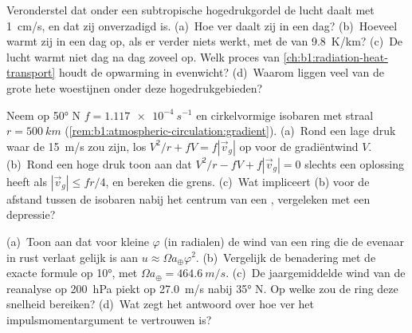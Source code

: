 \begin{exercise}[$\star\star$]\label{exo:b1:atmospheric-circulation:9}
Veronderstel dat onder een subtropische hogedrukgordel de lucht daalt met \qty{1}{cm/s}, en dat zij onverzadigd is. (a)~Hoe ver daalt zij in een dag? (b)~Hoeveel warmt zij in een dag op, als er verder niets werkt, met de  van \qty{9.8}{K/km}? (c)~De lucht warmt niet dag na dag zoveel op. Welk proces van \cref{ch:b1:radiation-heat-transport} houdt de opwarming in evenwicht? (d)~Waarom liggen veel van de grote hete woestijnen onder deze hogedrukgebieden?
\end{exercise}

\begin{exercise}[$\star\star\star$]\label{exo:b1:atmospheric-circulation:10}
Neem op \ang{50} N $f = \qty{1.117e-4}{s^{-1}}$ en cirkelvormige isobaren met straal
$r = \qty{500}{km}$ (\cref{rem:b1:atmospheric-circulation:gradient}). (a)~Rond
een lage druk waar de  \qty{15}{m/s} zou zijn, los $V^2/r + fV =
f|\vec v_g|$ op voor de gradiëntwind $V$. (b)~Rond een hoge druk toon aan dat $V^2/r - fV + f
|\vec v_g| = 0$ slechts een oplossing heeft als $|\vec v_g| \leq fr/4$, en bereken die grens.
(c)~Wat impliceert (b) voor de afstand tussen de isobaren nabij het centrum van een
, vergeleken met een depressie?
\end{exercise}

\begin{exercise}[$\star\star\star$]\label{exo:b1:atmospheric-circulation:11}
(a)~Toon aan dat voor kleine $\varphi$ (in radialen) de wind van een ring die de evenaar in rust verlaat
gelijk is aan $u \approx \Omega a_\oplus\varphi^2$. (b)~Vergelijk de benadering met
de exacte formule op \ang{10}, met $\Omega a_\oplus = \qty{464.6}{m/s}$. (c)~De
jaargemiddelde wind van de reanalyse op \qty{200}{hPa} piekt op \qty{27.0}{m/s} nabij
\ang{35} N. Op welke  zou de ring deze snelheid bereiken? (d)~Wat zegt het antwoord over hoe ver het impulsmomentargument te vertrouwen is?
\end{exercise}

